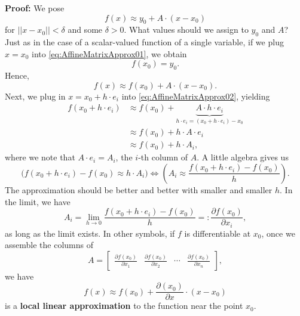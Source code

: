 \textbf{Proof:} We pose
\begin{equation}
    \label{eq:AffineMatrixApprox01}
    f(x) \approx  y_0 + A \cdot (x-x_0)
\end{equation}
for $||x-x_0|| < \delta$ and some $\delta>0$. What values should we assign to $y_0$ and $A$? Just as in the case of a scalar-valued function of a single variable, if we plug $x =x_0$ into \eqref{eq:AffineMatrixApprox01}, we obtain
$$ f(x_0) = y_0.$$
Hence, 
\begin{equation}
    \label{eq:AffineMatrixApprox02}
    f(x) \approx  f(x_0) + A\cdot(  x-x_0).
\end{equation}
Next, we plug in $x=x_0 + h\cdot e_i$ into \eqref{eq:AffineMatrixApprox02}, yielding
\begin{align*}
    f(x_0 + h\cdot e_i) &\approx  f(x_0) + \underbrace{A\cdot h\cdot e_i}_{h\cdot e_i=(x_0 + h\cdot e_i)-x_0} \\
    & \approx f(x_0) + h \cdot A \cdot e_i \\
    & \approx f(x_0) + h \cdot A_i,
\end{align*} 
where we note that $ A \cdot e_i = A_i$, the $i$-th column of $A$. A little algebra gives us
\begin{equation}
    \label{eq:AffineMatrixApprox03}
  \big(  f(x_0 + h\cdot e_i) - f(x_0) \approx h\cdot A_i \big) \iff \left( A_i \approx  \frac{ f(x_0 + h\cdot e_i) - f(x_0) }{h} \right).
\end{equation}
The approximation should be better and better with smaller and smaller $h$. In the limit, we have
\begin{equation}
    \label{eq:AffineMatrixApprox04}
A_i= \lim_{h \to 0} \frac{ f(x_0 + h\cdot e_i) - f(x_0) }{h}=: \frac{\partial f(x_0)}{\partial x_i},
\end{equation}
as long as the limit exists. In other symbols, if $f$ is differentiable at $x_0$, once we assemble the columns of 
$$A=  \left[\begin{array}{cccc}
      \frac{\partial f(x_0)}{\partial x_1} & \frac{\partial f(x_0)}{\partial x_2} & \cdots & \frac{\partial f(x_0)}{\partial x_n}
    \end{array} \right],$$ 
we have
\begin{equation}
    \label{eq:AffineMatrixApprox05}
    f(x) \approx  f(x_0) +  \frac{\partial (x_0)}{ \partial x} \cdot (x-x_0)
\end{equation}
is a \textbf{local linear approximation} to the function near the point $x_0$.

\Qed

